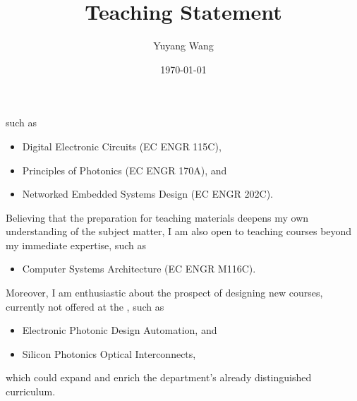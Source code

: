 



\title{Teaching Statement}

\def\courseOneName{Digital Electronic Circuits}
\def\courseOneNumber{EC ENGR 115C}
\def\courseTwoName{Principles of Photonics}
\def\courseTwoNumber{EC ENGR 170A}
\def\courseThreeName{Networked Embedded Systems Design}
\def\courseThreeNumber{EC ENGR 202C}
\def\courseFourName{Computer Systems Architecture}
\def\courseFourNumber{EC ENGR M116C}
\def\courseFiveName{VLSI Design Automation}
\def\courseFiveNumber{EC ENGR 201A}
\def\courseSixName{Electronic Photonic Design Automation}
\def\courseSevenName{Silicon Photonics Optical Interconnects}

\def\rsCustom{%
such as 
\begin{itemize}[nosep]
    \item \courseOneName{} (\courseOneNumber{}),
    \item \courseTwoName{} (\courseTwoNumber{}), and
    \item \courseThreeName{} (\courseThreeNumber{}).
\end{itemize}
Believing that the preparation for teaching materials deepens my own understanding of the subject matter, I am also open to teaching courses beyond my immediate expertise, such as
\begin{itemize}[nosep]
    \item \courseFourName{} (\courseFourNumber{}).
\end{itemize}
Moreover, I am enthusiastic about the prospect of designing new courses, currently not offered at the \appSchool{}, such as
\begin{itemize}[nosep]
    \item \courseSixName{}, and 
    \item \courseSevenName{},
\end{itemize}
which could expand and enrich the department's already distinguished curriculum.
}

\author{Yuyang Wang}
\date{\today}
\makeatletter
\fancyfoot[L]{\scshape \MakeLowercase{\@author}}
\fancyfoot[R]{{\scshape \MakeLowercase{\@title}}\quad{\LARGE\sfrac{\thepage}{\pageref*{LastPage}}}}
\makeatother



\maketitle%
\thispagestyle{fancy}


\rsCustom{}


\footnotesize


